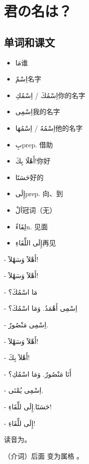 \chapter{君の名は？}


\section{单词和课文}

\begin{itemize}
    \item \ac{مَا}{谁}
    \item \ac{اِسْمٌ}{名字}
    \item \ac{اِسْمُكَ / اِسْمُكِ}{你的名字}
    \item \ac{اِسْمِى}{我的名字}
    \item \ac{اِسْمُهُ / اِسْمُهَا}{他的名字}
    \item \ac{بِ}{prep. 借助}
    \item \ac{أَهْلََا بِكَ!}{你好}
    \item \ac{حَسَنََا}{好的}
    \item \ac{إِلَى}{prep. 向、到}
    \item \ac{اَلْ}{冠词（无）}
    \item \ac{لِقَاءٌ}{n. 见面}
    \item \ac{إِلَى اللِّقَاءِ}{再见}
\end{itemize}

\begin{Arabic}
    - أَهْلاََ وَسَهْلاََ! 

    - أَهْلاََ وَسَهْلاََ!

    - مَا اسْمُكَ؟

    - اِسْمِى أَهْمَدُ. وَمَا اسْمُكَ؟

    - اِسْمِى مَنْصُورٌ.

    - أَهْلاََ وَسَهْلاََ!

    - أَهْلاََ بِكَ!

    - أَنَا مَنْصُورٌ. وَمَا اسْمُكِ؟

    - اِسْمِى يُمْنَى.

    - حَسَنََا.إِلَى للِّقَاءِ!

    - إِلَى للِّقَاءِ! 
\end{Arabic}

\begin{note}
    读音为。

     （介词）后面  变为属格  。
\end{note}

